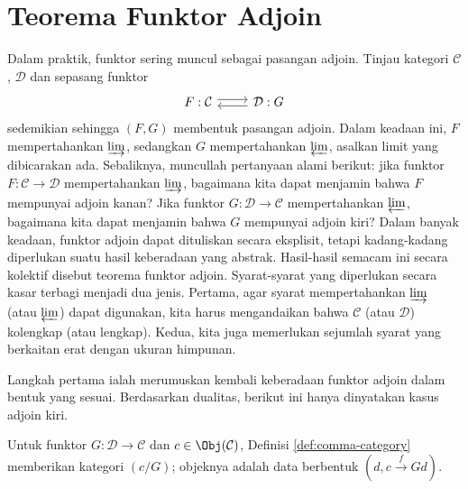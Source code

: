 
\section{Teorema Funktor Adjoin}\label{sec:AFT}
\hypertarget{o014.aljabr2.chapter1.adjoint-functor-theorem}{ }

Dalam praktik, funktor sering muncul sebagai pasangan adjoin. Tinjau kategori
$\mathcal{C}$, $\mathcal{D}$ dan sepasang funktor
\[\begin{tikzcd}
	F: \mathcal{C} \arrow[shift left, r] & \mathcal{D}: G \arrow[shift left, l]
\end{tikzcd}\]
sedemikian sehingga $(F,G)$ membentuk pasangan adjoin. Dalam keadaan ini,
$F$ mempertahankan $\varinjlim$, sedangkan $G$ mempertahankan
$\varprojlim$, asalkan limit yang dibicarakan ada. Sebaliknya, muncullah
pertanyaan alami berikut: jika funktor $F:\mathcal{C}\to\mathcal{D}$
mempertahankan $\varinjlim$, bagaimana kita dapat menjamin bahwa $F$
mempunyai adjoin kanan? Jika funktor $G:\mathcal{D}\to\mathcal{C}$
mempertahankan $\varprojlim$, bagaimana kita dapat menjamin bahwa $G$
mempunyai adjoin kiri? Dalam banyak keadaan, funktor adjoin dapat dituliskan
secara eksplisit, tetapi kadang-kadang diperlukan suatu hasil keberadaan yang
abstrak. Hasil-hasil semacam ini secara kolektif disebut teorema funktor
adjoin. Syarat-syarat yang diperlukan secara kasar terbagi menjadi dua jenis.
Pertama, agar syarat mempertahankan $\varinjlim$ (atau $\varprojlim$) dapat
digunakan, kita harus mengandaikan bahwa $\mathcal{C}$ (atau $\mathcal{D}$)
kolengkap (atau lengkap). Kedua, kita juga memerlukan sejumlah syarat yang
berkaitan erat dengan ukuran himpunan.

Langkah pertama ialah merumuskan kembali keberadaan funktor adjoin dalam bentuk
yang sesuai. Berdasarkan dualitas, berikut ini hanya dinyatakan kasus adjoin
kiri.

Untuk funktor $G:\mathcal{D}\to\mathcal{C}$ dan
$c\in\Obj(\mathcal{C})$, Definisi \ref{def:comma-category} memberikan
kategori $(c/G)$; objeknya adalah data berbentuk
$(d,c\xrightarrow{f}Gd)$.

